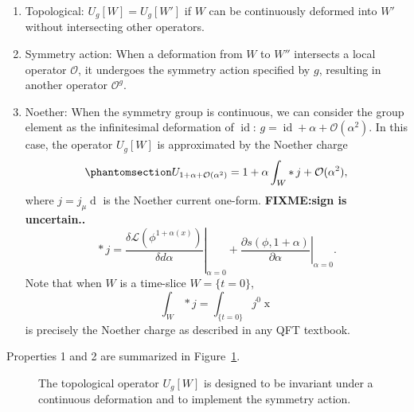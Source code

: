 \documentclass[
  letterpaper,
  DIV=11,
  numbers=noendperiod]{scrreport}
\providecommand{\tightlist}{%
  \setlength{\itemsep}{0pt}\setlength{\parskip}{0pt}}\usepackage{longtable,booktabs,array}
\DeclareMathOperator{\id}{id}
\newcommand{\stdim}{D}
\begin{document}
\begin{tcolorbox}[enhanced jigsaw, opacityback=0, opacitybacktitle=0.6, leftrule=.75mm, arc=.35mm, coltitle=black, breakable, colframe=quarto-callout-important-color-frame, titlerule=0mm, colback=white, bottomrule=.15mm, left=2mm, colbacktitle=quarto-callout-important-color!10!white, toptitle=1mm, bottomtitle=1mm, title=\textcolor{quarto-callout-important-color}{\faExclamation}\hspace{0.5em}{Properties of the Symmetry Topological Operator}, rightrule=.15mm, toprule=.15mm]

\begin{enumerate}
\def\labelenumi{\arabic{enumi}.}
\tightlist
\item
  Topological: \(U_g[W] = U_g[W']\) if \(W\) can be continuously
  deformed into \(W'\) without intersecting other operators.
\item
  Symmetry action: When a deformation from \(W\) to \(W''\) intersects a
  local operator \(\mathcal{O}\), it undergoes the symmetry action
  specified by \(g\), resulting in another operator \(\mathcal{O}^g\).
\item
  Noether: When the symmetry group is continuous, we can consider the
  group element as the infinitesimal deformation of \(\id\):
  \(g = \id + \alpha + \mathcal{O}(\alpha^2)\). In this case, the
  operator \(U_g[W]\) is approximated by the Noether charge
  \begin{equation}\phantomsection\label{eq-Noether-approx}{
   U_{1+\alpha+\mathcal{O}(\alpha^2)} = 1 + \alpha \int_W \mathop{*}j +\mathcal{O}(\alpha^2),
   }\end{equation} where \(j = j_\mu\mathop{dx^\mu}\) is the Noether
  current one-form. \textbf{FIXME:sign is uncertain..} \[
   \mathop{*}j = \left.\frac{\delta\mathcal{L}(\phi^{1+\alpha(x)})}{\delta d\alpha}\right|_{\alpha=0} + \left.\frac{\partial s(\phi, 1+ \alpha)}{\partial \alpha}\right|_{\alpha=0}.
   \] Note that when \(W\) is a time-slice \(W=\{t=0\}\), \[
  \int_W \mathop{*} j = \int_{\{t=0\}} j^0 \mathop{d^{\stdim-1}x}
  \] is precisely the Noether charge as described in any QFT textbook.
\end{enumerate}

Properties 1 and 2 are summarized in Figure~\ref{fig-op-action}.

\end{tcolorbox}

\begin{figure}[t]


\caption{\label{fig-op-action}The topological operator \(U_g[W]\) is
designed to be invariant under a continuous deformation and to implement
the symmetry action.}

\end{figure}%
\end{document}
